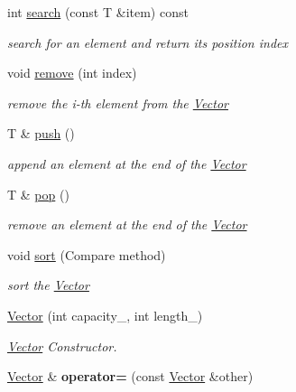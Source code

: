 \begin{DoxyCompactItemize}
\item 
int \hyperlink{class_magnum_1_1_vector_a239e0fba9b962a359c7cf1b38c5d00f2}{search} (const T \&item) const 
\begin{DoxyCompactList}\small\item\em search for an element and return its position index \end{DoxyCompactList}\item 
void \hyperlink{class_magnum_1_1_vector_ad31f0a95b95546807be0f67678ca7f2c}{remove} (int index)
\begin{DoxyCompactList}\small\item\em remove the i-\/th element from the \hyperlink{class_magnum_1_1_vector}{Vector} \end{DoxyCompactList}\item 
T \& \hyperlink{class_magnum_1_1_vector_af1b172b31bf8b09d5cde611cbf6c1cfd}{push} ()
\begin{DoxyCompactList}\small\item\em append an element at the end of the \hyperlink{class_magnum_1_1_vector}{Vector} \end{DoxyCompactList}\item 
T \& \hyperlink{class_magnum_1_1_vector_abda6b15e2fe5c9d8b29a54316231848b}{pop} ()
\begin{DoxyCompactList}\small\item\em remove an element at the end of the \hyperlink{class_magnum_1_1_vector}{Vector} \end{DoxyCompactList}\item 
void \hyperlink{class_magnum_1_1_vector_a71123256e74acc86ec065eec55f1ef08}{sort} (Compare method)
\begin{DoxyCompactList}\small\item\em sort the \hyperlink{class_magnum_1_1_vector}{Vector} \end{DoxyCompactList}\item 
\hyperlink{class_magnum_1_1_vector_afc61b13a96e6067c1b71ece8d858efbd}{Vector} (int capacity\+\_, int length\+\_)
\begin{DoxyCompactList}\small\item\em \hyperlink{class_magnum_1_1_vector}{Vector} Constructor. \end{DoxyCompactList}\item 
\hyperlink{class_magnum_1_1_vector}{Vector} \& {\bfseries operator=} (const \hyperlink{class_magnum_1_1_vector}{Vector} \&other)\hypertarget{class_magnum_1_1_vector_a98db9eb9896fa5290b3149d5b571c560}{}\label{class_magnum_1_1_vector_a98db9eb9896fa5290b3149d5b571c560}


\end{DoxyCompactItemize}
